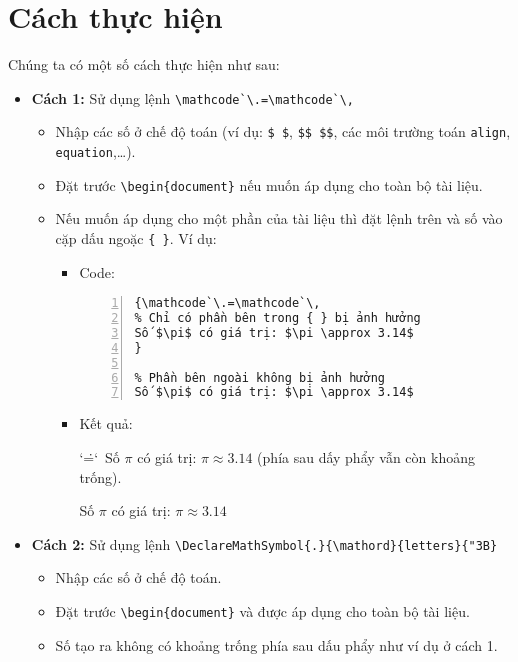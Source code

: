 \documentclass[12pt,a4paper]{article}
\begin{document}
\section{Cách thực hiện}
	Chúng ta có một số cách thực hiện như sau:
		\begin{itemize}
			\item \textbf{Cách 1:} Sử dụng lệnh \Verb|\mathcode`\.=\mathcode`\,|
				\begin{itemize}
					\item Nhập các số ở chế độ toán (ví dụ: \Verb|$ $|,  \Verb|$$ $$|, các môi trường toán \Verb|align|, \Verb|equation|,\ldots).
					\item Đặt trước \Verb|\begin{document}| nếu muốn áp dụng cho toàn bộ tài liệu.
						
					\item Nếu muốn áp dụng cho một phần của tài liệu thì đặt lệnh trên và số vào cặp dấu ngoặc \Verb|{ }|. Ví dụ:
						\begin{itemize}
\item Code:
\begin{Verbatim}[xleftmargin=10mm, numbers=left]
{\mathcode`\.=\mathcode`\,
% Chỉ có phần bên trong { } bị ảnh hưởng
Số $\pi$ có giá trị: $\pi \approx 3.14$
}

% Phần bên ngoài không bị ảnh hưởng
Số $\pi$ có giá trị: $\pi \approx 3.14$
\end{Verbatim}

\item Kết quả:

{\mathcode`\.=\mathcode`\,
Số $\pi$ có giá trị: $\pi \approx 3.14$ (phía sau dấy phẩy vẫn còn khoảng trống).
}

Số $\pi$ có giá trị: $\pi \approx 3.14$
						
						\end{itemize}										
				\end{itemize}
			\item \textbf{Cách 2:} Sử dụng lệnh \Verb|\DeclareMathSymbol{.}{\mathord}{letters}{"3B}|
				\begin{itemize}
					\item Nhập các số ở chế độ toán.
						
					\item Đặt trước \Verb|\begin{document}| và được áp dụng cho toàn bộ tài liệu.
						
					\item Số tạo ra không có khoảng trống phía sau dấu phẩy như ví dụ ở cách 1.
				\end{itemize}
				

\end{itemize}
\end{document}
